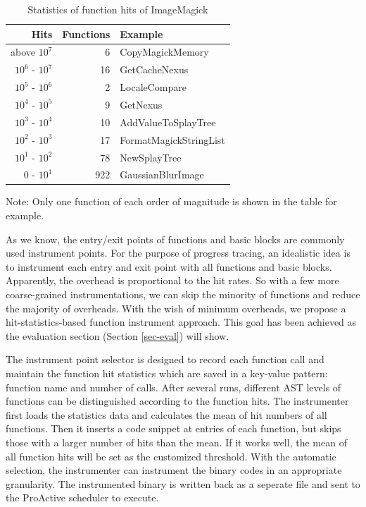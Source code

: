 \begin{table}[h]
\caption{Statistics of function hits of ImageMagick}
\label{table:inst-stats}
\begin{center}
\begin{tabular}{r|r|l}
\hline
Hits & Functions & Example \\
\hline
above $10^7$ & 6 & CopyMagickMemory \\
$10^6$ - $10^7$ & 16 & GetCacheNexus \\
$10^5$ - $10^6$ & 2 & LocaleCompare \\
$10^4$ - $10^5$ & 9 & GetNexus \\
$10^3$ - $10^4$ & 10 & AddValueToSplayTree \\
$10^2$ - $10^3$ & 17 & FormatMagickStringList \\
$10^1$ - $10^2$ & 78 & NewSplayTree \\
$0$    - $10^1$ & 922 & GaussianBlurImage \\
\hline
\end{tabular}
\end{center}
Note: Only one function of each order of magnitude is shown in the table for example.
\end{table}

As we know, the entry/exit points of functions and basic blocks are commonly used
instrument points. For the purpose of progress tracing, an idealistic idea is to instrument 
each entry and exit point with all functions and basic blocks. Apparently, the overhead is
proportional to the hit rates. So with a few more coarse-grained instrumentations, we
can skip the minority of functions and reduce the majority of overheads. With the wish of minimum
overheads, we propose a hit-statistics-based function instrument
approach. This goal has been achieved as the evaluation section (Section \ref{sec-eval}) will show.

The instrument point selector is designed to record each function call and maintain the
function hit statistics which are saved in a key-value pattern: function name and number of
calls. After several runs, different AST levels of functions can be distinguished
according to the function hits. The instrumenter first loads the statistics data and
calculates the mean of hit numbers of all functions. Then it inserts a code snippet at
entries of each function, but skips those with a larger number of hits than the mean.
If it works well, the mean of all function hits will be set as the customized
threshold. With the automatic selection, the instrumenter can instrument the
binary codes in an appropriate granularity. The instrumented binary is written back as
a seperate file and sent to the ProActive scheduler to execute.

